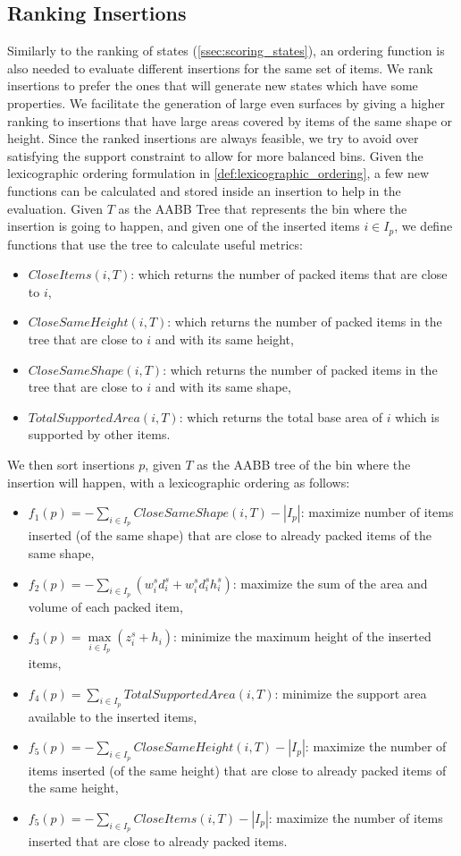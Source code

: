 \subsection{Ranking Insertions}
\label{ssec:scoring_insertions}%
Similarly to the ranking of states (\cref{ssec:scoring_states}), an ordering function is also needed to evaluate different insertions for the same set of items.
We rank insertions to prefer the ones that will generate new states which have some properties.
We facilitate the generation of large even surfaces by giving a higher ranking to insertions that have large areas covered by items of the same shape or height.
Since the ranked insertions are always feasible, we try to avoid over satisfying the support constraint to allow for more balanced bins.
Given the lexicographic ordering formulation in \cref{def:lexicographic_ordering}, a few new functions can be calculated and stored inside an insertion to help in the evaluation.
Given $T$ as the AABB Tree that represents the bin where the insertion is going to happen, and given one of the inserted items $i \in I_p$, we define functions that use the tree to calculate useful metrics:
\begin{itemize}
    \item $CloseItems(i, T)$: which returns the number of packed items that are close to $i$,
    \item $CloseSameHeight(i, T)$: which returns the number of packed items in the tree that are close to $i$ and with its same height,
    \item $CloseSameShape(i, T)$: which returns the number of packed items in the tree that are close to $i$ and with its same shape,
    \item $TotalSupportedArea(i, T)$: which returns the total base area of $i$ which is supported by other items.
\end{itemize}
We then sort insertions $p$, given $T$ as the AABB tree of the bin where the insertion will happen, with a lexicographic ordering as follows:
\begin{itemize}
    \item $f_1(p) = -\sum\limits_{i \in I_p}{CloseSameShape(i, T)} - |I_p|$: maximize number of items inserted (of the same shape) that are close to already packed items of the same shape,
    \item $f_2(p) = -\sum\limits_{i \in I_p}{(w^s_i d^s_i + w^s_i d^s_i h^s_i)}$: maximize the sum of the area and volume of each packed item,
    \item $f_3(p) = \max\limits_{i \in I_p}(z^s_i + h_i)$: minimize the maximum height of the inserted items,
    \item $f_4(p) = \sum\limits_{i \in I_p}{TotalSupportedArea(i, T)}$: minimize the support area available to the inserted items,
    \item $f_5(p) = -\sum\limits_{i \in I_p}{CloseSameHeight(i, T)} - |I_p|$: maximize the number of items inserted (of the same height) that are close to already packed items of the same height,
    \item $f_5(p) = -\sum\limits_{i \in I_p}{CloseItems(i, T)} - |I_p|$: maximize the number of items inserted that are close to already packed items.
\end{itemize}
